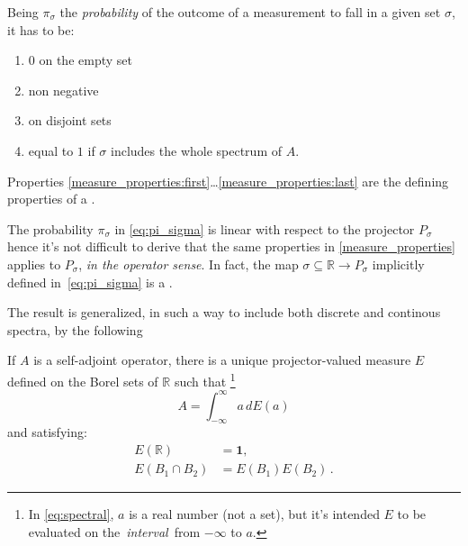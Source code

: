 \begin{remark}\label{measure_properties}
  Being $\pi_{\sigma}$ the \emph{probability} of the outcome of a measurement to
  fall in a given set $\sigma$, it has to be:
  \begin{enumerate}
    \item \label{measure_properties:first} $0$ on the empty set
    \item non negative
    \item \label{measure_properties:last}  on disjoint sets
    \item equal to $1$ if $\sigma$ includes the whole spectrum of $A$.
  \end{enumerate}
\end{remark}

\begin{remark}
  Properties \ref{measure_properties:first}\dots\ref{measure_properties:last}
  are the defining properties of a  \parencite{EncMath_Measure}.
\end{remark}

The probability $\pi_{\sigma}$ in \eqref{eq:pi_sigma} is linear with respect to the projector
$P_{\sigma}$ hence it's not difficult to derive that the same properties in
\autoref{measure_properties} applies to $P_{\sigma}$, \emph{in the operator sense}.
In fact, the map $\sigma \subseteq \mathbb{R} \rightarrow P_{\sigma}$
implicitly defined in~\eqref{eq:pi_sigma} is a .

The result is generalized,
in such a way to include both discrete and continous spectra,
by the following \parencite{VonNeumann, Ballentine}
\begin{theorem}
  If $A$ is a self-adjoint operator,
  there is a unique projector-valued measure $E$
  defined on the Borel sets of $\mathbb{R}$
  such that
  \footnote{
    In \eqref{eq:spectral}, $a$ is a real number (not a set),
    but it's intended $E$ to be evaluated
    on the~\emph{interval}~from $-\infty$ to $a$.
  }
  \begin{equation}\label{eq:spectral}
    A=\int_{-\infty}^{\infty}a\, dE(a)
  \end{equation}
  and satisfying:
  \begin{align*}
    E(\mathbb{R})       & =\mathbf{1},\\
    E(B_{1}\cap B_{2}) & =E(B_{1})E(B_{2})\,.
  \end{align*}
\end{theorem}

